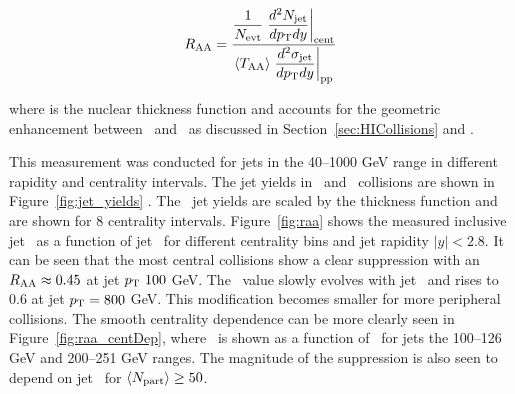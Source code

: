 \begin{align}
\mbox{$R_{\rm AA}$}  = \dfrac{\dfrac{1}{N_{\rm evt}} \left. \dfrac{d^2 N_{\rm jet}}{d\mbox{$p_{\mathrm{T}}$} dy} \right|_{\rm cent}}{ \langle T_{\rm AA} \rangle \left. \dfrac{d^2\sigma_{\rm jet}}{d\mbox{$p_{\mathrm{T}}$} dy} \right|_{\rm pp}}
\end{align}

where \TAA is the nuclear thickness function and accounts for the geometric enhancement between \pp\ and \pbpb\ as discussed in Section~\ref{sec:HICollisions} and \cite{doi:10.1146/annurev.nucl.57.090506.123020}. 

This measurement was conducted for jets in the 40--1000 GeV range in different rapidity and centrality intervals. The jet yields in \pp\ and \pbpb\ collisions are shown in Figure~\ref{fig:jet_yields} . The \pbpb\ jet yields are scaled by the thickness function and are shown for 8 centrality intervals. Figure~\ref{fig:raa} shows the measured inclusive jet \RAA\ as a function of jet \pt\ for different centrality bins and jet rapidity $|y| < 2.8$. It can be seen that the most central collisions show a clear suppression with an $\mbox{$R_{\rm AA}$} \approx 0.45$ at jet $\mbox{$p_{\mathrm{T}}$}\ 100$ GeV. The \RAA\ value slowly evolves with jet \pt\ and rises to 0.6 at jet $\mbox{$p_{\mathrm{T}}$} = 800$ GeV. This modification becomes smaller for more peripheral collisions. The smooth centrality dependence can be more clearly seen in Figure~\ref{fig:raa_centDep}, where \RAA\ is shown as a function of \ANpart\ for jets the 100--126 GeV and 200--251 GeV ranges. The magnitude of the suppression is also seen to depend on jet \pt\ for $\mbox{$\langle N_{\mathrm{part}}\rangle$} \geq 50$. 


